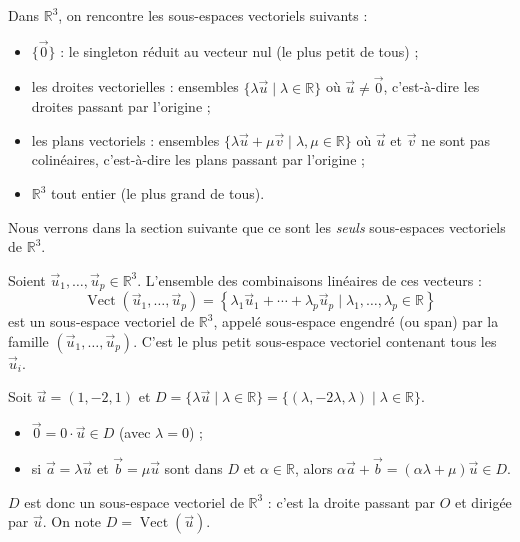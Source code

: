 \documentclass[11pt]{article}
\newcommand{\cle}[1]{{\popxbold\color{popdark}#1}}
\begin{document}
\begin{propriete}
Dans $\mathbb{R}^3$, on rencontre les sous-espaces vectoriels suivants :
\begin{itemize}
\item $\{\vec{0}\}$ : le singleton réduit au vecteur nul (le plus petit de tous) ;
\item les \cle{droites vectorielles} : ensembles $\{\lambda\vec{u} \mid \lambda \in \mathbb{R}\}$ où $\vec{u} \neq \vec{0}$, c'est-à-dire les droites passant par l'origine ;
\item les \cle{plans vectoriels} : ensembles $\{\lambda\vec{u} + \mu\vec{v} \mid \lambda, \mu \in \mathbb{R}\}$ où $\vec{u}$ et $\vec{v}$ ne sont pas colinéaires, c'est-à-dire les plans passant par l'origine ;
\item $\mathbb{R}^3$ tout entier (le plus grand de tous).
\end{itemize}
Nous verrons dans la section suivante que ce sont les \emph{seuls} sous-espaces vectoriels de $\mathbb{R}^3$.
\end{propriete}

\begin{propriete}
Soient $\vec{u}_1, \dots, \vec{u}_p \in \mathbb{R}^3$. L'ensemble des combinaisons linéaires de ces vecteurs :
\[
\operatorname{Vect}(\vec{u}_1, \dots, \vec{u}_p) = \left\{ \lambda_1\vec{u}_1 + \cdots + \lambda_p\vec{u}_p \mid \lambda_1, \dots, \lambda_p \in \mathbb{R} \right\}
\]
est un sous-espace vectoriel de $\mathbb{R}^3$, appelé \cle{sous-espace engendré} (ou \cle{span}) par la famille $(\vec{u}_1, \dots, \vec{u}_p)$. C'est le plus petit sous-espace vectoriel contenant tous les $\vec{u}_i$.
\end{propriete}

\begin{exemplebox}
Soit $\vec{u} = (1,-2,1)$ et $D = \{\lambda\vec{u} \mid \lambda \in \mathbb{R}\} = \{(\lambda, -2\lambda, \lambda) \mid \lambda \in \mathbb{R}\}$.
\begin{itemize}
\item $\vec{0} = 0\cdot\vec{u} \in D$ (avec $\lambda = 0$) ;
\item si $\vec{a} = \lambda\vec{u}$ et $\vec{b} = \mu\vec{u}$ sont dans $D$ et $\alpha \in \mathbb{R}$, alors $\alpha\vec{a} + \vec{b} = (\alpha\lambda + \mu)\vec{u} \in D$.
\end{itemize}
$D$ est donc un sous-espace vectoriel de $\mathbb{R}^3$ : c'est la droite passant par $O$ et dirigée par $\vec{u}$. On note $D = \operatorname{Vect}(\vec{u})$.
\end{exemplebox}
\end{document}

